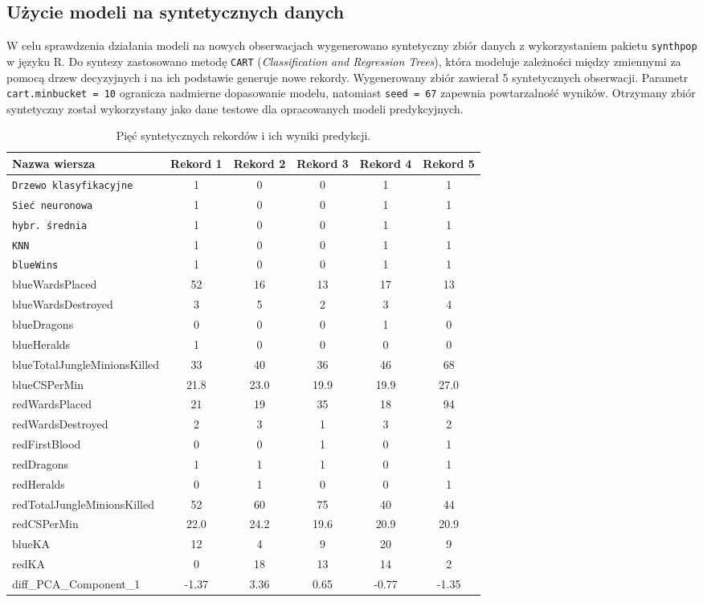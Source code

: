 \documentclass[twoside]{customStyle}
\begin{document}
\newpage
\subsection{Użycie modeli na syntetycznych danych}
W celu sprawdzenia działania modeli na nowych obserwacjach wygenerowano syntetyczny zbiór danych z wykorzystaniem pakietu \texttt{synthpop} w języku R. Do syntezy zastosowano metodę \texttt{CART} (\textit{Classification and Regression Trees}), która modeluje zależności między zmiennymi za pomocą drzew decyzyjnych i na ich podstawie generuje nowe rekordy. Wygenerowany zbiór zawierał 5 syntetycznych obserwacji. Parametr \texttt{cart.minbucket = 10} ogranicza nadmierne dopasowanie modelu, natomiast \texttt{seed = 67} zapewnia powtarzalność wyników. Otrzymany zbiór syntetyczny został wykorzystany jako dane testowe dla opracowanych modeli predykcyjnych.

\begin{table}[H]
  \centering
\begin{tabular}{l *{5}{c}}
    \toprule
    \textbf{Nazwa wiersza} & \textbf{Rekord 1} & \textbf{Rekord 2} & \textbf{Rekord 3} & \textbf{Rekord 4} & \textbf{Rekord 5} \\
    \midrule
	\texttt{Drzewo klasyfikacyjne} & 1 & 0 & 0 & 1 & 1 \\
	\texttt{Sieć neuronowa} & 1 & 0 & 0 & 1 & 1 \\
	\texttt{hybr. średnia} & 1 & 0 & 0 & 1 & 1 \\
	\texttt{KNN} & 1 & 0 & 0 & 1 & 1 \\
	\texttt{blueWins} & 1 & 0 & 0 & 1 & 1 \\
	blueWardsPlaced & 52 & 16 & 13 & 17 & 13 \\
	blueWardsDestroyed & 3 & 5 & 2 & 3 & 4 \\
	blueDragons & 0 & 0 & 0 & 1 & 0 \\
	blueHeralds & 1 & 0 & 0 & 0 & 0 \\
	blueTotalJungleMinionsKilled & 33 & 40 & 36 & 46 & 68 \\
	blueCSPerMin & 21.8 & 23.0 & 19.9 & 19.9 & 27.0 \\
	redWardsPlaced & 21 & 19 & 35 & 18 & 94 \\
	redWardsDestroyed & 2 & 3 & 1 & 3 & 2 \\
	redFirstBlood & 0 & 0 & 1 & 0 & 1 \\
	redDragons & 1 & 1 & 1 & 0 & 1 \\
	redHeralds & 0 & 1 & 0 & 0 & 1 \\
	redTotalJungleMinionsKilled & 52 & 60 & 75 & 40 & 44 \\
	redCSPerMin & 22.0 & 24.2 & 19.6 & 20.9 & 20.9 \\
	blueKA & 12 & 4 & 9 & 20 & 9 \\
	redKA & 0 & 18 & 13 & 14 & 2 \\
	diff\_PCA\_Component\_1 & -1.37 & 3.36 & 0.65 & -0.77 & -1.35 \\
    \bottomrule
\end{tabular}
\caption{Pięć syntetycznych rekordów i ich wyniki predykcji.}
\end{table}
\end{document}
